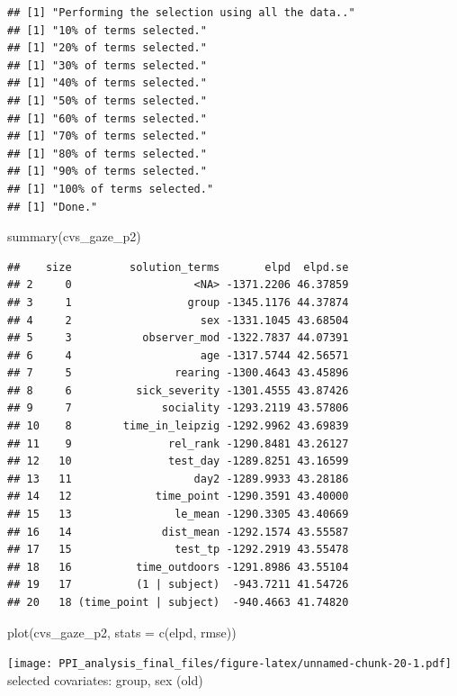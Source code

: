 \documentclass[
]{article}
\newenvironment{Shaded}{\begin{snugshade}}{\end{snugshade}}
\newcommand{\AttributeTok}[1]{\textcolor[rgb]{0.77,0.63,0.00}{#1}}
\newcommand{\FunctionTok}[1]{\textcolor[rgb]{0.00,0.00,0.00}{#1}}
\newcommand{\NormalTok}[1]{#1}
\newcommand{\StringTok}[1]{\textcolor[rgb]{0.31,0.60,0.02}{#1}}
\begin{document}
\begin{verbatim}
## [1] "Performing the selection using all the data.."
## [1] "10% of terms selected."
## [1] "20% of terms selected."
## [1] "30% of terms selected."
## [1] "40% of terms selected."
## [1] "50% of terms selected."
## [1] "60% of terms selected."
## [1] "70% of terms selected."
## [1] "80% of terms selected."
## [1] "90% of terms selected."
## [1] "100% of terms selected."
## [1] "Done."
\end{verbatim}

\begin{Shaded}
\begin{Highlighting}[]
\FunctionTok{summary}\NormalTok{(cvs\_gaze\_p2)}
\end{Highlighting}
\end{Shaded}

\begin{verbatim}
##    size         solution_terms       elpd  elpd.se
## 2     0                   <NA> -1371.2206 46.37859
## 3     1                  group -1345.1176 44.37874
## 4     2                    sex -1331.1045 43.68504
## 5     3           observer_mod -1322.7837 44.07391
## 6     4                    age -1317.5744 42.56571
## 7     5                rearing -1300.4643 43.45896
## 8     6          sick_severity -1301.4555 43.87426
## 9     7              sociality -1293.2119 43.57806
## 10    8        time_in_leipzig -1292.9962 43.69839
## 11    9               rel_rank -1290.8481 43.26127
## 12   10               test_day -1289.8251 43.16599
## 13   11                   day2 -1289.9933 43.28186
## 14   12             time_point -1290.3591 43.40000
## 15   13                le_mean -1290.3305 43.40669
## 16   14              dist_mean -1292.1574 43.55587
## 17   15                test_tp -1292.2919 43.55478
## 18   16          time_outdoors -1291.8986 43.55104
## 19   17          (1 | subject)  -943.7211 41.54726
## 20   18 (time_point | subject)  -940.4663 41.74820
\end{verbatim}

\begin{Shaded}
\begin{Highlighting}[]
\FunctionTok{plot}\NormalTok{(cvs\_gaze\_p2, }\AttributeTok{stats =} \FunctionTok{c}\NormalTok{(}\StringTok{\textquotesingle{}elpd\textquotesingle{}}\NormalTok{, }\StringTok{\textquotesingle{}rmse\textquotesingle{}}\NormalTok{))}
\end{Highlighting}
\end{Shaded}

\texttt{[image: PPI\_analysis\_final\_files/figure-latex/unnamed-chunk-20-1.pdf]}
selected covariates: group, sex (old)
\end{document}
